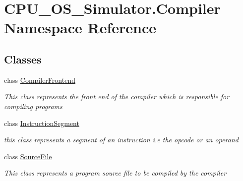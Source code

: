 \hypertarget{namespace_c_p_u___o_s___simulator_1_1_compiler}{}\section{C\+P\+U\+\_\+\+O\+S\+\_\+\+Simulator.\+Compiler Namespace Reference}
\label{namespace_c_p_u___o_s___simulator_1_1_compiler}
\subsection*{Classes}
\begin{DoxyCompactItemize}
\item 
class \hyperlink{class_c_p_u___o_s___simulator_1_1_compiler_1_1_compiler_frontend}{Compiler\+Frontend}
\begin{DoxyCompactList}\small\item\em This class represents the front end of the compiler which is responsible for compiling programs \end{DoxyCompactList}\item 
class \hyperlink{class_c_p_u___o_s___simulator_1_1_compiler_1_1_instruction_segment}{Instruction\+Segment}
\begin{DoxyCompactList}\small\item\em this class represents a segment of an instruction i.\+e the opcode or an operand \end{DoxyCompactList}\item 
class \hyperlink{class_c_p_u___o_s___simulator_1_1_compiler_1_1_source_file}{Source\+File}
\begin{DoxyCompactList}\small\item\em This class represents a program source file to be compiled by the compiler \end{DoxyCompactList}\end{DoxyCompactItemize}
